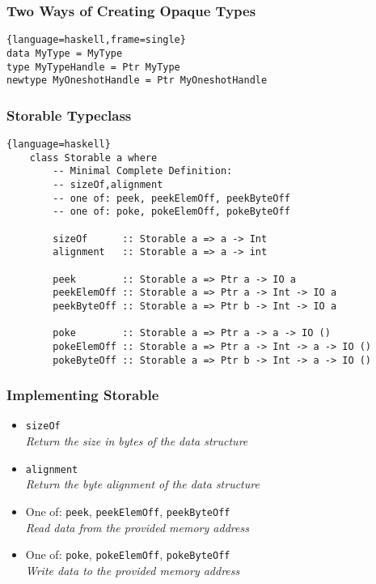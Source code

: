 \documentclass{beamer}
\begin{document}
\begin{frame}[fragile]
    \frametitle{Two Ways of Creating Opaque Types}

    \begin{lstlisting}{language=haskell,frame=single}
data MyType = MyType
type MyTypeHandle = Ptr MyType
newtype MyOneshotHandle = Ptr MyOneshotHandle
    \end{lstlisting}
\end{frame}

\begin{frame}[fragile]
    \frametitle{Storable Typeclass}
    \begin{lstlisting}{language=haskell}
    class Storable a where
        -- Minimal Complete Definition:
        -- sizeOf,alignment
        -- one of: peek, peekElemOff, peekByteOff
        -- one of: poke, pokeElemOff, pokeByteOff

        sizeOf      :: Storable a => a -> Int
        alignment   :: Storable a => a -> int

        peek        :: Storable a => Ptr a -> IO a
        peekElemOff :: Storable a => Ptr a -> Int -> IO a
        peekByteOff :: Storable a => Ptr b -> Int -> IO a

        poke        :: Storable a => Ptr a -> a -> IO ()
        pokeElemOff :: Storable a => Ptr a -> Int -> a -> IO ()
        pokeByteOff :: Storable a => Ptr b -> Int -> a -> IO ()
    \end{lstlisting}
\end{frame}
\begin{frame}
    \frametitle{Implementing Storable}
    \begin{itemize}
        \item {{\tt sizeOf} \\
                {\it Return the size in bytes of the data structure}
            }
        \item {{\tt alignment} \\
                {\it Return the byte alignment of the data structure}
            }
        \item {One of: {\tt peek}, {\tt peekElemOff}, {\tt peekByteOff} \\
                {\it Read data from the provided memory address}
            }
        \item {One of: {\tt poke}, {\tt pokeElemOff}, {\tt pokeByteOff} \\
                {\it Write data to the provided memory address}
            }
    \end{itemize}
\end{frame}
\end{document}
